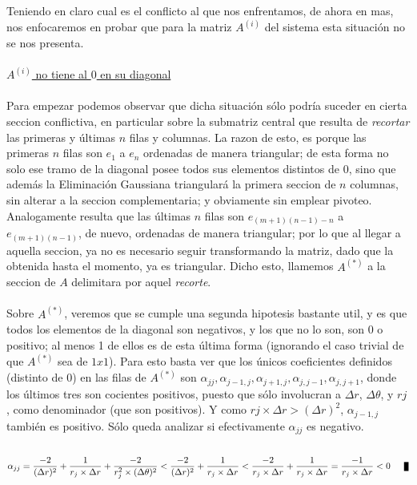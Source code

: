 Teniendo en claro cual es el conflicto al que nos enfrentamos, de ahora en mas, nos enfocaremos en probar que para la matriz $A^{(i)}$ del sistema esta situaci\'on no se nos presenta.
\\
\\
\underline{$A^{(i)}$ no tiene al $0$ en su diagonal}
\\
\\
Para empezar podemos observar que dicha situaci\'on s\'olo podr\'ia suceder en cierta seccion conflictiva, en particular sobre la submatriz central que resulta de \textit{recortar} las primeras y \'ultimas $n$ filas y columnas. La razon de esto, es porque las primeras $n$ filas son $\mathit{e}_1$ a $\mathit{e}_n$ ordenadas de manera triangular; de esta forma no solo ese tramo de la diagonal posee todos sus elementos distintos de $0$, sino que adem\'as la Eliminaci\'on Gaussiana triangular\'a la primera seccion de $n$ columnas, sin alterar a la seccion complementaria; y obviamente sin emplear pivoteo. Analogamente resulta que las \'ultimas $n$ filas son $\mathit{e}_{(m+1)(n-1)-n}$ a $\mathit{e}_{(m+1)(n-1)}$, de nuevo, ordenadas de manera triangular; por lo que al llegar a aquella seccion, ya no es necesario seguir transformando la matriz, dado que la obtenida hasta el momento, ya es triangular. Dicho esto, llamemos $A^{(*)}$ a la seccion de $A$ delimitara por aquel \textit{recorte}.
\\
\\
Sobre $A^{(*)}$, veremos que se cumple una segunda hipotesis bastante util, y es que todos los elementos de la diagonal son negativos, y los que no lo son, son $0$ o positivo; 
al menos 1 de ellos es de esta \'ultima forma (ignorando el caso trivial de que $A^{(*)}$ sea de $1x1$).
Para esto basta ver que los \'unicos coeficientes definidos (distinto de $0$) en las filas de $A^{(*)}$ son $\alpha_{jj}, \alpha_{j-1,j}, \alpha_{j+1,j}, \alpha_{j,j-1}, \alpha_{j,j+1}$, donde los \'ultimos tres son cocientes positivos, puesto que s\'olo involucran a $\Delta r$, $\Delta \theta$, y $rj$, como denominador (que son positivos). Y como $rj \times \Delta r > (\Delta r)^{2}$, $\alpha_{j-1,j}$ también es positivo. S\'olo queda analizar si efectivamente $\alpha_{jj}$ es negativo. 
\\
\\
\begin{equation}
\alpha_{jj} = \frac{-2}{(\Delta r)^2} + \frac{1}{r_j \times \Delta r} + \frac{-2}{r_j^2 \times (\Delta \theta)^2} < \frac{-2}{(\Delta r)^2} + \frac{1}{r_j \times \Delta r} < \frac{-2}{r_j \times \Delta r} + \frac{1}{r_j \times \Delta r} = \frac{-1}{r_j \times \Delta r} < 0 \qed
\end{equation}
